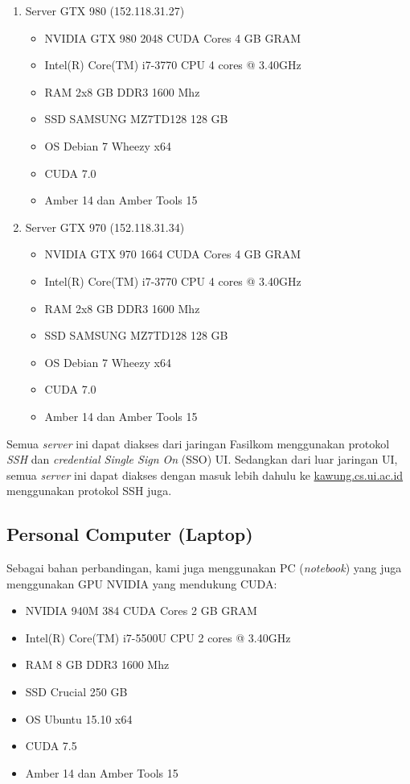 \begin{enumerate}
	\item Server GTX 980 (152.118.31.27)
	\begin{itemize}
		\item NVIDIA GTX 980 2048 CUDA Cores 4 GB GRAM
		\item Intel(R) Core(TM) i7-3770 CPU 4 cores @ 3.40GHz 
		\item RAM 2x8 GB DDR3 1600 Mhz
		\item SSD SAMSUNG MZ7TD128 128 GB		
		\item OS Debian 7 Wheezy x64
		\item CUDA 7.0
		\item Amber 14 dan Amber Tools 15
	\end{itemize}
	\item Server GTX 970 (152.118.31.34)
	\begin{itemize}
		\item NVIDIA GTX 970 1664 CUDA Cores 4 GB GRAM
		\item Intel(R) Core(TM) i7-3770 CPU 4 cores @ 3.40GHz
		\item RAM 2x8 GB DDR3 1600 Mhz
		\item SSD SAMSUNG MZ7TD128 128 GB		
		\item OS Debian 7 Wheezy x64
		\item CUDA 7.0
		\item Amber 14 dan Amber Tools 15
	\end{itemize}
\end{enumerate}

Semua \textit{server} ini dapat diakses dari jaringan Fasilkom menggunakan protokol \textit{SSH} dan \textit{credential Single Sign On} (SSO) UI. Sedangkan dari luar jaringan UI, semua \textit{server} ini dapat diakses dengan masuk lebih dahulu ke \url{kawung.cs.ui.ac.id} menggunakan protokol SSH juga.

\subsection{Personal Computer (Laptop)}

Sebagai bahan perbandingan, kami juga menggunakan PC (\textit{notebook}) yang juga menggunakan GPU NVIDIA yang mendukung CUDA:
\begin{itemize}
	\item NVIDIA 940M 384 CUDA Cores 2 GB GRAM
	\item Intel(R) Core(TM) i7-5500U CPU 2 cores @ 3.40GHz
	\item RAM 8 GB DDR3 1600 Mhz
	\item SSD Crucial 250 GB		
	\item OS Ubuntu 15.10 x64
	\item CUDA 7.5
	\item Amber 14 dan Amber Tools 15
\end{itemize}

